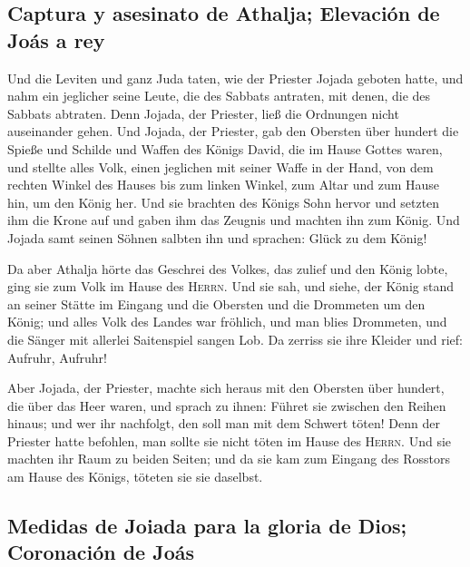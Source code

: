 \hypertarget{captura-y-asesinato-de-athalja-elevaciuxf3n-de-jouxe1s-a-rey}{%
\subsection{Captura y asesinato de Athalja; Elevación de Joás a
rey}\label{captura-y-asesinato-de-athalja-elevaciuxf3n-de-jouxe1s-a-rey}}

 Und die Leviten und ganz Juda taten, wie der Priester
Jojada geboten hatte, und nahm ein jeglicher seine Leute, die des
Sabbats antraten, mit denen, die des Sabbats abtraten. Denn Jojada, der
Priester, ließ die Ordnungen nicht auseinander gehen.  Und
Jojada, der Priester, gab den Obersten über hundert die Spieße und
Schilde und Waffen des Königs David, die im Hause Gottes waren,
 und stellte alles Volk, einen jeglichen mit seiner Waffe
in der Hand, von dem rechten Winkel des Hauses bis zum linken Winkel,
zum Altar und zum Hause hin, um den König her.  Und sie
brachten des Königs Sohn hervor und setzten ihm die Krone auf und gaben
ihm das Zeugnis und machten ihn zum König. Und Jojada samt seinen Söhnen
salbten ihn und sprachen: Glück zu dem König!

 Da aber Athalja hörte das Geschrei des Volkes, das
zulief und den König lobte, ging sie zum Volk im Hause des
\textsc{Herrn}.  Und sie sah, und siehe, der König stand
an seiner Stätte im Eingang und die Obersten und die Drommeten um den
König; und alles Volk des Landes war fröhlich, und man blies Drommeten,
und die Sänger mit allerlei Saitenspiel sangen Lob. Da zerriss sie ihre
Kleider und rief: Aufruhr, Aufruhr!

 Aber Jojada, der Priester, machte sich heraus mit den
Obersten über hundert, die über das Heer waren, und sprach zu ihnen:
Führet sie zwischen den Reihen hinaus; und wer ihr nachfolgt, den soll
man mit dem Schwert töten! Denn der Priester hatte befohlen, man sollte
sie nicht töten im Hause des \textsc{Herrn}.  Und sie
machten ihr Raum zu beiden Seiten; und da sie kam zum Eingang des
Rosstors am Hause des Königs, töteten sie sie daselbst.

\hypertarget{medidas-de-joiada-para-la-gloria-de-dios-coronaciuxf3n-de-jouxe1s}{%
\subsection{Medidas de Joiada para la gloria de Dios; Coronación de
Joás}\label{medidas-de-joiada-para-la-gloria-de-dios-coronaciuxf3n-de-jouxe1s}}

